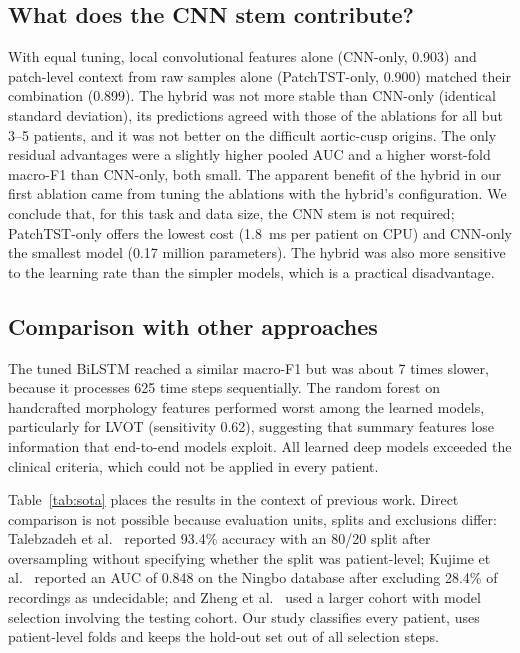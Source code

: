 \documentclass[preprint,12pt]{elsarticle}
\begin{document}
\subsection{What does the CNN stem contribute?}
With equal tuning, local convolutional features alone (CNN-only, 0.903) and patch-level context from raw samples alone (PatchTST-only, 0.900) matched their combination (0.899). The hybrid was not more stable than CNN-only (identical standard deviation), its predictions agreed with those of the ablations for all but 3--5 patients, and it was not better on the difficult aortic-cusp origins. The only residual advantages were a slightly higher pooled AUC and a higher worst-fold macro-F1 than CNN-only, both small. The apparent benefit of the hybrid in our first ablation came from tuning the ablations with the hybrid's configuration. We conclude that, for this task and data size, the CNN stem is not required; PatchTST-only offers the lowest cost (1.8~ms per patient on CPU) and CNN-only the smallest model (0.17 million parameters). The hybrid was also more sensitive to the learning rate than the simpler models, which is a practical disadvantage.

\subsection{Comparison with other approaches}
The tuned BiLSTM reached a similar macro-F1 but was about 7 times slower, because it processes 625 time steps sequentially. The random forest on handcrafted morphology features performed worst among the learned models, particularly for LVOT (sensitivity 0.62), suggesting that summary features lose information that end-to-end models exploit. All learned deep models exceeded the clinical criteria, which could not be applied in every patient.

Table~\ref{tab:sota} places the results in the context of previous work. Direct comparison is not possible because evaluation units, splits and exclusions differ: Talebzadeh et al.\ \cite{talebzadeh2025outflow} reported 93.4\% accuracy with an 80/20 split after oversampling without specifying whether the split was patient-level; Kujime et al.\ \cite{kujime2024semantic} reported an AUC of 0.848 on the Ningbo database after excluding 28.4\% of recordings as undecidable; and Zheng et al.\ \cite{zheng2022origins} used a larger cohort with model selection involving the testing cohort. Our study classifies every patient, uses patient-level folds and keeps the hold-out set out of all selection steps.
\end{document}
